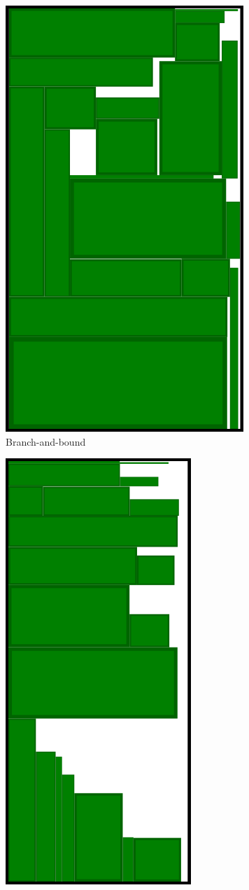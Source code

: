 \documentclass{article}
\begin{document}
\begin{figure}[!h]
\centering
\begin{subfigure}[b]{.35\textwidth}
  \centering
  \includegraphics[width=.5\linewidth]{diagrams/BruteForceFit20.png}
  \caption{Branch-and-bound}
\end{subfigure}%
\begin{subfigure}[b]{.35\textwidth}
  \centering
  \includegraphics[width=.5\linewidth]{diagrams/FFDH20Rects.png}

\end{subfigure}
\end{figure}
\end{document}
